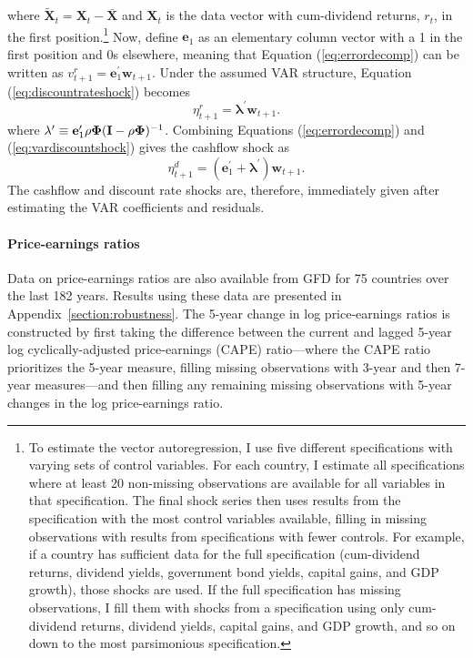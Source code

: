 \documentclass[12pt]{article}
\numberwithin{equation}{section}
\begin{document}
where $\tilde{\mathbf{X}}_{t}=\mathbf{X}_{t}-\bar{\mathbf{X}}$ and $\mathbf{X}_{t}$ is the data vector with cum-dividend returns, $r_{t}$, in the first position.\footnote{To estimate the vector autoregression, I use five different specifications with varying sets of control variables. For each country, I estimate all specifications where at least 20 non-missing observations are available for all variables in that specification. The final shock series then uses results from the specification with the most control variables available, filling in missing observations with results from specifications with fewer controls. For example, if a country has sufficient data for the full specification (cum-dividend returns, dividend yields, government bond yields, capital gains, and GDP growth), those shocks are used. If the full specification has missing observations, I fill them with shocks from a specification using only cum-dividend returns, dividend yields, capital gains, and GDP growth, and so on down to the most parsimonious specification.} Now, define $\mathbf{e}_{1}$ as an elementary column vector with a 1 in the first position and 0s elsewhere, meaning that Equation (\ref{eq:errordecomp}) can be written as $v^{r}_{t+1} = \mathbf{e}_{1}^{\prime}\mathbf{w}_{t+1}$. Under the assumed VAR structure, Equation (\ref{eq:discountrateshock}) becomes
\begin{equation}
\eta^{r}_{t+1} =\mathbf{\lambda}^{\prime} \mathbf{w}_{t+1}.\label{eq:vardiscountshock}
\end{equation}
where $\mathbf{\lambda}^{\prime} \equiv\mathbf{e}_{1}^{\prime}\text{\ensuremath{\rho}}\mathbf{\Phi}(\mathbf{I}-\rho\mathbf{\Phi})^{-1}$. Combining Equations (\ref{eq:errordecomp}) and (\ref{eq:vardiscountshock}) gives the cashflow shock as
\begin{equation}
\eta^{d}_{t+1} =(\mathbf{e}_{1}^{\prime}+\mathbf{\lambda}^{\prime})\mathbf{w}_{t+1}.
\end{equation}
The cashflow and discount rate shocks are, therefore, immediately given after estimating the VAR coefficients and residuals.

\paragraph{Price-earnings ratios}
Data on price-earnings ratios are also available from GFD for 75 countries over the last 182 years. Results using these data are presented in Appendix~\ref{section:robustness}. The 5-year change in log price-earnings ratios is constructed by first taking the difference between the current and lagged 5-year log cyclically-adjusted price-earnings (CAPE) ratio---where the CAPE ratio prioritizes the 5-year measure, filling missing observations with 3-year and then 7-year measures---and then filling any remaining missing observations with 5-year changes in the log price-earnings ratio.
\end{document}

